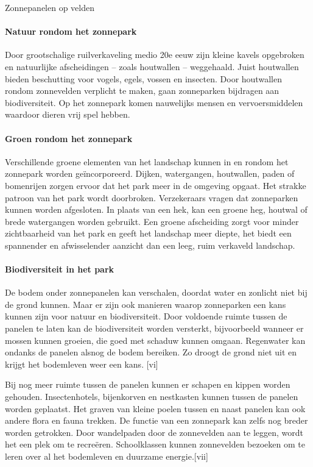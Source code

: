 \begin{voorstel}{Zonnepanelen op velden}
\begin{multicols}{2}
\begin{overwegingen}
\paragraph{Natuur rondom het zonnepark}
Door grootschalige ruilverkaveling medio 20e eeuw zijn kleine kavels opgebroken en natuurlijke afscheidingen – zoals houtwallen – weggehaald. Juist houtwallen bieden beschutting voor vogels, egels, vossen en insecten. Door houtwallen rondom zonnevelden verplicht te maken, gaan zonneparken bijdragen aan biodiversiteit.  Op het zonnepark komen nauwelijks mensen en vervoersmiddelen waardoor dieren vrij spel hebben.

\paragraph{Groen rondom het zonnepark}
Verschillende groene elementen van het landschap kunnen in en rondom het zonnepark worden geïncorporeerd. Dijken, watergangen, houtwallen, paden of bomenrijen zorgen ervoor dat het park meer in de omgeving opgaat. Het strakke patroon van het park wordt doorbroken. Verzekeraars vragen dat zonneparken kunnen worden afgesloten. In plaats van een hek, kan een groene heg,  houtwal of brede watergangen worden gebruikt. Een groene afscheiding zorgt voor minder zichtbaarheid van het park en geeft het landschap meer diepte, het biedt een spannender en afwisselender aanzicht dan een leeg, ruim verkaveld landschap.

\paragraph{Biodiversiteit in het park}
De bodem onder zonnepanelen kan verschalen, doordat water en zonlicht niet bij de grond kunnen.  Maar er zijn ook manieren waarop zonneparken een kans kunnen zijn voor natuur en biodiversiteit.  Door voldoende ruimte tussen de panelen te laten kan de biodiversiteit worden versterkt, bijvoorbeeld wanneer er mossen kunnen groeien, die goed met schaduw kunnen omgaan. Regenwater kan ondanks de panelen alsnog de bodem bereiken. Zo droogt de grond niet uit en krijgt het bodemleven weer een kans. [vi]

Bij nog meer ruimte tussen de panelen kunnen er schapen en kippen worden gehouden. Insectenhotels, bijenkorven en nestkasten kunnen tussen de panelen worden geplaatst. Het graven van kleine poelen tussen en naast panelen kan ook andere flora en fauna trekken. De functie van een zonnepark kan zelfs nog breder worden getrokken. Door wandelpaden door de zonnevelden aan te leggen, wordt het een plek om te recreëren. Schoolklassen kunnen zonnevelden bezoeken om te leren over al het bodemleven en duurzame energie.[vii]


\end{overwegingen}
\end{multicols}
\end{voorstel}
